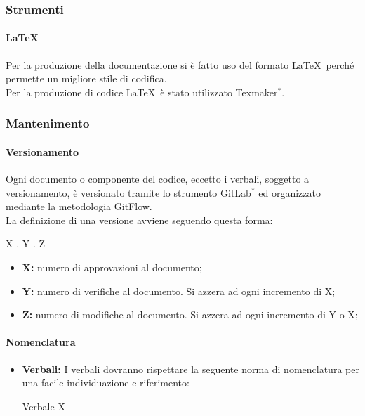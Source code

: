 \documentclass[11pt,a4paper]{article}
\begin{document}
{	\subsubsection{Strumenti}
	
	\paragraph{\LaTeX\\}
	 Per la produzione della documentazione si è fatto uso del formato \LaTeX\ perché permette un migliore stile di codifica.\\
	Per la produzione di codice \LaTeX\ è stato utilizzato Texmaker$^*$.
	
	\subsubsection{Mantenimento}
	
	\paragraph{Versionamento\\}
	Ogni documento o componente del codice, eccetto i verbali, soggetto a versionamento, è versionato tramite lo strumento GitLab$^*$ ed organizzato mediante la metodologia GitFlow.\\
	La definizione di una versione avviene seguendo questa forma:
	\begin{center}
		X . Y . Z
	\end{center}
	
	\begin{itemize}
		\item \textbf{X:} numero di approvazioni al documento;
		\item \textbf{Y:} numero di verifiche al documento. Si azzera ad ogni incremento di X;
		\item \textbf{Z:} numero di modifiche al documento. Si azzera ad ogni incremento di Y o X;
	\end{itemize}
	
	\paragraph{Nomenclatura}
	
	\begin{itemize}
		\item \textbf{Verbali:} I verbali dovranno rispettare la seguente norma di nomenclatura per una facile individuazione e riferimento:
		\begin{center}
			Verbale-X
		\end{center}
		

\end{itemize}}
\end{document}
